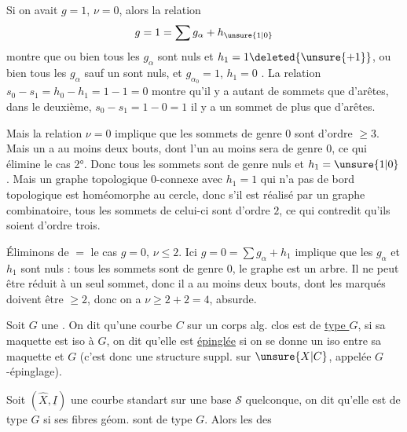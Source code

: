 Si on avait $g=1$, $\nu=0$, alors la relation
\[
g=1=\sum g_\alpha+h_{\unsure{1|0}}
\]
montre que ou bien tous les $g_\alpha$ sont nuls et $h_1=1\deleted{\unsure{+1}}$, ou bien tous les $g_\alpha$ sauf un  sont nuls, et $g_{\alpha_0}=1$, $h_1=0$ .  La relation $s_0-s_1=h_0-h_1=1-1=0$ montre qu'il y a autant de sommets que d'arêtes, dans le deuxième, $s_0-s_1=1-0=1$ il y a un sommet de plus que d'arêtes.

Mais la relation $\nu=0$ implique que les sommets de genre $0$ sont d'ordre $\geq3$.  Mais un   a au moins deux bouts, dont l'un au moins sera de genre $0$, ce qui élimine le cas 2°. Donc tous les sommets sont de genre nuls  et $h_1=\unsure{1|0}$. Mais  un graphe topologique $0$-connexe avec $h_1=1$ qui n'a pas de  bord topologique est homéomorphe au cercle, donc s'il est réalisé par un graphe combinatoire, tous les sommets de celui-ci sont d'ordre $2$, ce qui contredit qu'ils soient d'ordre trois.

Éliminons de $=$ le cas $g=0$, $\nu\leq2$. Ici $g=0=\sum g_\alpha+h_1$ implique que les $g_\alpha$ et $h_1$ sont nuls : tous les sommets sont de genre $0$, le graphe est un arbre. Il ne peut être réduit à un seul sommet, donc il a au moins deux bouts, dont les  marqués doivent être $\geq2$, donc  on a $\nu\geq2+2=4$, absurde.

Soit $G$ une . On dit qu'une  courbe  $C$ sur un corps alg. clos est de \uline{type $G$}, si sa maquette est iso à $G$, on dit qu'elle est \uline{épinglée} si on se donne un iso entre sa maquette et $G$ (c'est donc une structure suppl. sur $\unsure{X|C}$, appelée $G$-épinglage).

Soit $(\widehat X,\underline I)$ une courbe standart sur une base $\mathcal S$ quelconque, on dit qu'elle est de type $G$ si ses fibres géom. sont de type $G$. Alors les  des

